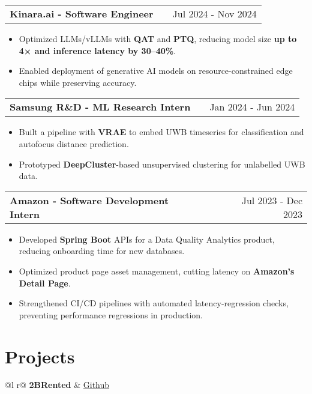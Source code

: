 \documentclass[a4paper,12pt]{article}
\makeatletter
\newenvironment{joblong}[2]
    {
    \begin{tabularx}{\linewidth}{@{}l X r@{}}
    \textbf{#1} & \hfill &  #2 \\[3.75pt]
    \end{tabularx}
    \begin{minipage}[t]{\linewidth}
    \begin{itemize}[nosep, leftmargin=1em, itemsep=1pt,label=--]
    }
    {
    \end{itemize}
    \end{minipage}    
    }
\makeatother
\begin{document}
\begin{joblong}{Kinara.ai - Software Engineer}{Jul 2024 - Nov 2024}
\item Optimized LLMs/vLLMs with \textbf{QAT} and \textbf{PTQ}, reducing model size \textbf{up to 4× and inference latency by 30–40\%}. 
\item Enabled deployment of generative AI models on resource-constrained edge chips while preserving accuracy.
\end{joblong}

\begin{joblong}{Samsung R\&D - ML Research Intern}{Jan 2024 - Jun 2024}
\item Built a pipeline with \textbf{VRAE} to embed UWB timeseries for classification and autofocus distance prediction.
\item Prototyped \textbf{DeepCluster}-based unsupervised clustering for unlabelled UWB data.
\end{joblong}

\begin{joblong}{Amazon - Software Development Intern}{Jul 2023 - Dec 2023}
\item Developed \textbf{Spring Boot} APIs for a Data Quality Analytics product, reducing onboarding time for new databases. 
\item Optimized product page asset management, cutting latency on \textbf{Amazon's Detail Page}.
\item Strengthened CI/CD pipelines with automated latency-regression checks, preventing performance regressions in production.
\end{joblong}
\vspace{-2mm}

\section{Projects}

\begin{tabularx}{\linewidth}{ @{}l r@{} }
\textbf{2BRented} & \hfill \href{https://github.com/nameetrajore/2BRented}{Github} \\[3.75pt]
 \\
\end{tabularx}
\vspace{-2mm}
\end{document}
